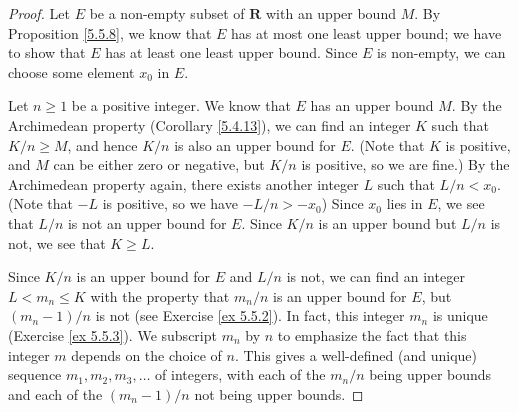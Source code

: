 \begin{proof}
    Let \(E\) be a non-empty subset of \(\mathbf{R}\) with an upper bound \(M\).
    By Proposition \ref{5.5.8}, we know that \(E\) has at most one least upper bound;
    we have to show that \(E\) has at least one least upper bound.
    Since \(E\) is non-empty, we can choose some element \(x_0\) in \(E\).

    Let \(n \geq 1\) be a positive integer.
    We know that \(E\) has an upper bound \(M\).
    By the Archimedean property (Corollary \ref{5.4.13}), we can find an integer \(K\) such that \(K / n \geq M\), and hence \(K / n\) is also an upper bound for \(E\).
    (Note that \(K\) is positive, and \(M\) can be either zero or negative, but \(K / n\) is positive, so we are fine.)
    By the Archimedean property again, there exists another integer \(L\) such that \(L / n < x_0\).
    (Note that \(-L\) is positive, so we have \(-L / n > -x_0\))
    Since \(x_0\) lies in \(E\), we see that \(L / n\) is not an upper bound for \(E\).
    Since \(K / n\) is an upper bound but \(L / n\) is not, we see that \(K \geq L\).

    Since \(K / n\) is an upper bound for \(E\) and \(L / n\) is not, we can find an integer \(L < m_n \leq K\) with the property that \(m_n / n\) is an upper bound for \(E\), but \((m_n - 1) / n\) is not (see Exercise \ref{ex 5.5.2}).
    In fact, this integer \(m_n\) is unique (Exercise \ref{ex 5.5.3}).
    We subscript \(m_n\) by \(n\) to emphasize the fact that this integer \(m\) depends on the choice of \(n\).
    This gives a well-defined (and unique) sequence \(m_1, m_2, m_3, \dots\) of integers, with each of the \(m_n / n\) being upper bounds and each of the \((m_n - 1) / n\) not being upper bounds.


\end{proof}
